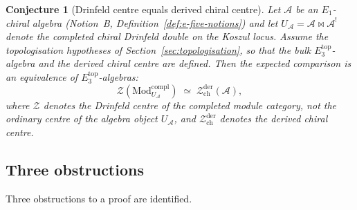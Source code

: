 \documentclass[11pt,reqno]{amsart}
\newtheorem{conjecture}[theorem]{Conjecture}
\theoremstyle{definition}
\theoremstyle{remark}
\providecommand{\cA}{\mathcal{A}}
\providecommand{\cZ}{\mathcal{Z}}
\providecommand{\Eone}{E_1}
\providecommand{\Ethree}{E_3}
\begin{document}
\begin{conjecture}[Drinfeld centre equals derived chiral centre]
\label{conj:e-drinfeld-center-equals-bulk}
Let $\cA$ be an $\Eone$-chiral algebra
\textup{(}Notion~B, Definition~\ref{def:e-five-notions}\textup{)}
and let \(U_\cA = \cA \bowtie \cA^!\) denote the completed chiral
Drinfeld double on the Koszul locus.
Assume the topologisation hypotheses of
Section~\ref{sec:topologisation}, so that the bulk
$\Ethree^{\mathrm{top}}$-algebra and the derived chiral centre
are defined. Then the expected comparison is an equivalence of
$\Ethree^{\mathrm{top}}$-algebras:
\begin{equation}\label{eq:e-closing}
\mathcal Z\!\left(\mathrm{Mod}^{\mathrm{compl}}_{U_\cA}\right)
\;\simeq\;
\cZ^{\mathrm{der}}_{\mathrm{ch}}(\cA),
\end{equation}
where \(\mathcal Z\) denotes the Drinfeld centre of the completed
module category, not the ordinary centre of the algebra object
\(U_\cA\), and \(\cZ^{\mathrm{der}}_{\mathrm{ch}}\) denotes the
derived chiral centre.
\end{conjecture}

\subsection{Three obstructions}

Three obstructions to a proof are identified.
\end{document}
